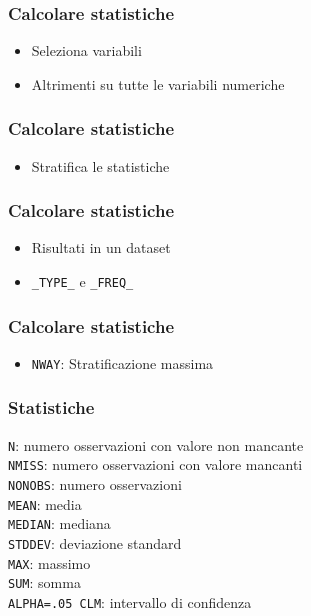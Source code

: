 \begin{frame}[containsverbatim]\frametitle{Calcolare statistiche}
  \begin{itemize}
  \item
    Seleziona variabili
  \item
    Altrimenti su tutte le variabili numeriche
  \end{itemize}
\end{frame}



\begin{frame}[containsverbatim]\frametitle{Calcolare statistiche}
  \begin{itemize}
  \item
    Stratifica le statistiche
  \end{itemize}
\end{frame}


\begin{frame}[containsverbatim]\frametitle{Calcolare statistiche}
  \begin{itemize}
  \item
    Risultati in un dataset
  \item
    \verb+_TYPE_+ e \verb+_FREQ_+
  \end{itemize}
\end{frame}

\begin{frame}[containsverbatim]\frametitle{Calcolare statistiche}
  \begin{itemize}
  \item
    \verb+NWAY+: Stratificazione massima
  \end{itemize}
\end{frame}

\begin{frame}\frametitle{Statistiche}
  \texttt{N}: numero osservazioni con valore non mancante\\
  \texttt{NMISS}: numero osservazioni con valore mancanti\\
  \texttt{NONOBS}: numero osservazioni\\
  \texttt{MEAN}: media\\
  \texttt{MEDIAN}: mediana\\
  \texttt{STDDEV}: deviazione standard\\
  \texttt{MAX}: massimo\\
  \texttt{SUM}: somma\\
  \texttt{ALPHA=.05 CLM}: intervallo di confidenza\\
\end{frame}


